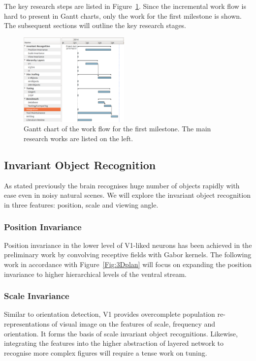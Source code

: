 \documentclass[journal]{journal}
\begin{document}
The key research steps are listed in Figure~\ref{Fig:gantt}.
Since the incremental work flow is hard to present in Gantt charts, only the work for the first milestone is shown.
The subsequent sections will outline the key research stages.



\begin{figure}[h!]
	\centering
	\includegraphics[width=0.48\textwidth]{pics/gantt.pdf}
	\caption{Gantt chart of the work flow for the first milestone.
	The main research works are listed on the left.
	}
	\label{Fig:gantt}
\end{figure}
\subsection{Invariant Object Recognition}
As stated previously the brain recognises huge number of objects rapidly with ease even in noisy natural scenes. We will explore the invariant object recognition in three features: position, scale and viewing angle.
\subsubsection{Position Invariance}
Position invariance in the lower level of V1-liked neurons has been achieved in the preliminary work by convolving receptive fields with Gabor kernels.
The following work in accordance with Figure~\ref{Fig:3Dplan} will focus on expanding the position invariance to higher hierarchical levels of the ventral stream.
\subsubsection{Scale Invariance}
Similar to orientation detection, V1 provides overcomplete population re-representations of visual image on the features of scale, frequency and orientation.
It forms the basis of scale invariant object recognitions.
Likewise, integrating the features into the higher abstraction of layered network to recognise more complex figures will require a tense work on tuning.
\end{document}
